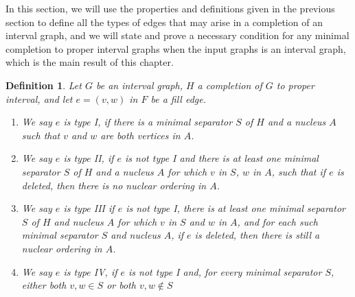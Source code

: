 \documentclass[12pt]{book}
\theoremstyle{plain}
\newtheorem{defn}[teo]{Definition}
\theoremstyle{remark}
\begin{document}
In this section, we will use the properties and definitions given in the previous section to define all the types of edges that may arise in a completion of an interval graph, and we will state and prove a necessary condition for any minimal completion to proper interval graphs when the input graphs is an interval graph, which is the main result of this chapter.


\begin{defn} 
Let $G$ be an interval graph, $H$ a completion of $G$ to proper interval, and let $e=(v,w)$ in $F$ be a fill edge.
	\begin{enumerate}
		\item We say \emph{$e$ is type I}, if there is a minimal separator $S$ of $H$ and a nucleus $A$ such that $v$ and $w$ are both vertices in $A$. \label{edge_typeI}
		\item We say \emph{$e$ is type II}, if $e$ \textit{is not type I} and there is at least one minimal separator $S$ of $H$ and a nucleus $A$ for which $v$ in $S$, $w$ in $A$, such that if $e$ is deleted, then there is no nuclear ordering in $A$. \label{edge_typeII}
		\item We say \emph{$e$ is type III} if $e$ is not type I, there is at least one minimal separator $S$ of $H$ and nucleus $A$ for which $v$ in $S$ and $w$ in $A$, and for each such minimal separator $S$ and nucleus $A$, if $e$ is deleted, then there is still a nuclear ordering in $A$. \label{edge_typeIII} 
		\item We say \emph{$e$ is type IV}, if $e$ is not type I and, for every minimal separator $S$, either both $v,w \in S$ or both $v,w \not\in S$ \label{edge_typeIV}
	\end{enumerate}
\end{defn}

\begin{comment}
\begin{defn} 
Let $G$ be an interval graph, $H$ a completion of $G$ to proper interval, and let $e=(v,w)$ in $F$ be a fill edge.
	\begin{enumerate}
		\item We say \emph{$e$ is type I}, if there is a minimal separator $S$ of $H$ and a nucleus $A$ such that $v$ and $w$ are both vertices in $A$. \label{edge_typeI}
		\item We say \emph{$e$ is type II}, if $e$ \textit{is not type I} and there is at least one minimal separator $S$ of $H$ and a nucleus $A$ for which $v$ in $S$, $w$ in $A$, such that if $e$ is deleted, then there is no nuclear ordering in $A$. \label{edge_typeII}
		\item We say \emph{$e$ is type III} if $e$ is not type I, and there is at least one minimal separator $S$ of $H$ and a nucleus $A$ for which $v$ in $S$, $w$ in $A$, such that if $e$ is deleted, then we can still find a nuclear ordering in $A$. \label{edge_typeIII} 
		\item We say \emph{$e$ is type IV}, if $e$ is not type I and, for every minimal separator $S$, either both $v,w \in S$ or both $v,w \not\in S$ \label{edge_typeIV}
	\end{enumerate}
\end{defn}
\end{comment}
\end{document}
